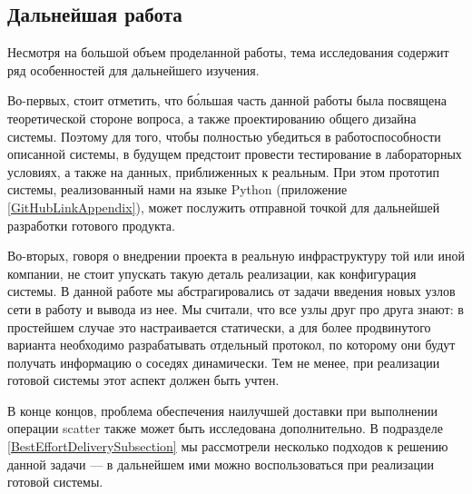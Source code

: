 \documentclass{article}
\theoremstyle{plain}
\theoremstyle{plain}
\theoremstyle{plain}
\theoremstyle{plain}
\theoremstyle{definition}
\theoremstyle{remark}
\theoremstyle{plain}
\begin{document}
{}
\subsection*{Дальнейшая работа}

Несмотря на большой объем проделанной работы, тема исследования содержит ряд особенностей для дальнейшего изучения.

Во-первых, стоит отметить, что б\'{о}льшая часть данной работы была посвящена теоретической стороне вопроса, а также проектированию общего дизайна системы. Поэтому для того, чтобы полностью убедиться в работоспособности описанной системы, в будущем предстоит провести тестирование в лабораторных условиях, а также на данных, приближенных к реальным. При этом прототип системы, реализованный нами на языке Python (приложение \ref{GitHubLinkAppendix}), может послужить отправной точкой для дальнейшей разработки готового продукта.

Во-вторых, говоря о внедрении проекта в реальную инфраструктуру той или иной компании, не стоит упускать такую деталь реализации, как конфигурация системы. В данной работе мы абстрагировались от задачи введения новых узлов сети в работу и вывода из нее. Мы считали, что все узлы друг про друга знают: в простейшем случае это настраивается статически, а для более продвинутого варианта необходимо разрабатывать отдельный протокол, по которому они будут получать информацию о соседях динамически. Тем не менее, при реализации готовой системы этот аспект должен быть учтен.

В конце концов, проблема обеспечения наилучшей доставки при выполнении операции scatter также может быть исследована дополнительно. В подразделе \ref{BestEffortDeliverySubsection} мы рассмотрели несколько подходов к решению данной задачи --- в дальнейшем ими можно воспользоваться при реализации готовой системы.

\cleardoublepage




\cleardoublepage

\end{document}
